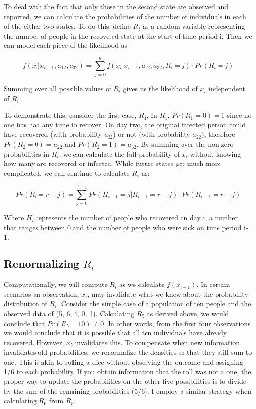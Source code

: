 \documentclass{svproc}
\begin{document}
To deal with the fact that only those in the second state are observed and reported, we can calculate the probabilities of the number of individuals in each of the either two states. To do this, define $R_i$ as a random variable representing the number of people in the recovered state at the start of time period i. Then we can model each piece of the likelihood as

\begin{equation}
f(x_i | x_{i-1}, a_{12}, a_{32}) =\sum_{j=0}^n f(x_i | x_{i-1}, a_{12}, a_{32}, R_i=j)\cdot Pr(R_i=j) 
\label{sum}
\end{equation}

Summing over all possible values of $R_i$ gives us the likelihood of $x_i$ independent of $R_i$.

To demonstrate this, consider the first case, $R_1$. In $R_1$, $Pr(R_1=0)=1$ since no one has had any time to recover. On day two, the original infected person could have recovered (with probability $a_{32}$) or not (with probability $a_{22}$), therefore $Pr(R_2=0) = a_{22}$ and $Pr(R_2=1)=a_{32}$. By summing over the non-zero probabilities in $R_i$, we can calculate the full probability of $x_i$ without knowing how many are recovered or infected. While future states get much more complicated, we can continue to calculate $R_i$ as:

\begin{equation}
Pr(R_i = r + j) = \sum_{j=0}^{x_{i-1}} Pr(H_{i-1}=j|R_{i-1}=r-j)\cdot Pr(R_{i-1}=r-j)
\end{equation}

Where $H_i$ represents the number of people who recovered on day i, a number that ranges between 0 and the number of people who were sick on time period i-1.

\subsection*{Renormalizing $R_i$}
Computationally, we will compute 
$R_i$ as we calculate $f(x_{i-1})$. In certain scenarios an observation, $x_i$, may invalidate what we knew about the probability distribution of $R_i$. Consider the simple case of a population of ten people and the observed data of (5, 6, 4, 0, 1). Calculating $R_5$ as derived above, we would conclude that $Pr(R_5 =10)\neq 0$. In other words, from the first four observations we would conclude that it is possible that all ten individuals have already recovered. However, $x_5$ invalidates this. To compensate when new information invalidates old  probabilities, we renormalize the densities so that they still sum to one. This is akin to rolling a dice without observing the outcome and assigning 1/6 to each probability. If you obtain information that the roll was not a one, the proper way to update the probabilities on the other five possibilities is to divide by the sum of the remaining probabilities (5/6). I employ a similar strategy when calculating $R_6$ from $R_5$.
\end{document}

